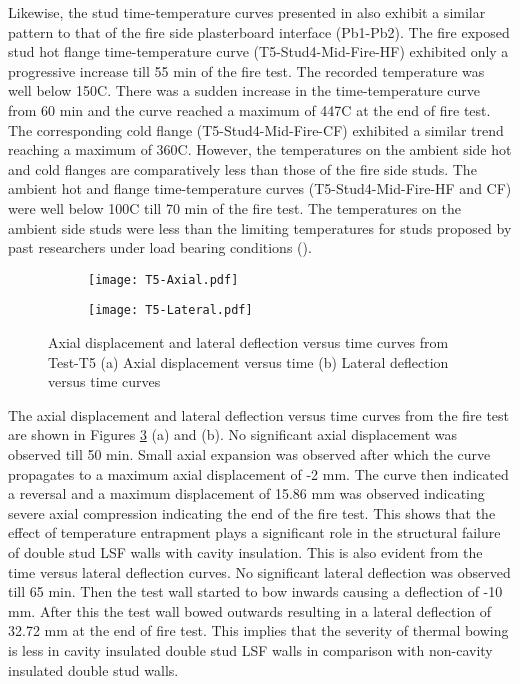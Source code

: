Likewise, the stud time-temperature curves presented in  also exhibit a similar pattern to that of the fire side plasterboard interface (Pb1-Pb2). The fire exposed stud hot flange time-temperature curve (T5-Stud4-Mid-Fire-HF) exhibited only a progressive increase till 55 min of the fire test. The recorded temperature was well below 150\degree C. There was a sudden increase in the time-temperature curve from 60 min and the curve reached a maximum of 447\degree C at the end of fire test. The corresponding cold flange (T5-Stud4-Mid-Fire-CF) exhibited a similar trend reaching a maximum of 360\degree C. However, the temperatures on the ambient side hot and cold flanges are comparatively less than those of the fire side studs. The ambient hot and flange time-temperature curves (T5-Stud4-Mid-Fire-HF and CF) were well below 100\degree C till 70 min of the fire test. The temperatures on the ambient side studs were less than the limiting temperatures for studs proposed by past researchers under load bearing conditions (\cite{Feng2003,Gunalan2013a}). 
\begin{figure}[!htbp]
	\centering
	\begin{subfigure}[b]{0.7\textwidth}
		\centering
		\texttt{[image: T5-Axial.pdf]}
		\caption{}
		\label{subfig:T5-Axial}
	\end{subfigure}
	\begin{subfigure}[b]{0.7\textwidth}
		\centering
		\texttt{[image: T5-Lateral.pdf]}
		\caption{}
		\label{subfig:T5-Lateral}
	\end{subfigure}
	   \caption{Axial displacement and lateral deflection versus time curves from Test-T5 (a) Axial displacement versus time (b) Lateral deflection versus time curves}
	   \label{fig:T5-Axial-Lateral}
\end{figure}

The axial displacement and lateral deflection versus time curves from the fire test are shown in Figures \ref{fig:T5-Axial-Lateral} (a) and (b). No significant axial displacement was observed till 50 min. Small axial expansion was observed after which the curve propagates to a maximum axial displacement of -2 mm. The curve then indicated a reversal and a maximum displacement of 15.86 mm was observed indicating severe axial compression indicating the end of the fire test. This shows that the effect of temperature entrapment plays a significant role in the structural failure of double stud LSF walls with cavity insulation. This is also evident from the time versus lateral deflection curves. No significant lateral deflection was observed till 65 min. Then the test wall started to bow inwards causing a deflection of -10 mm. After this the test wall bowed outwards resulting in a lateral deflection of 32.72 mm at the end of fire test. This implies that the severity of thermal bowing is less in cavity insulated double stud LSF walls in comparison with non-cavity insulated double stud walls. 

